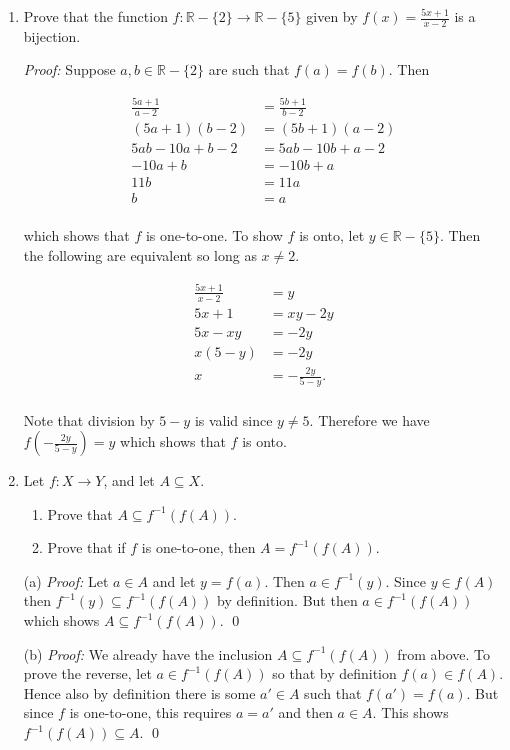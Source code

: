 \documentclass[12pt]{article}
\begin{document}
{\begin{enumerate}
This shows that for every $a\in A$, the values $(f\circ g)^{-1}(a)$ and $(g^{-1}\circ f^{-1})(a)$ are both $b$.  Therefore $(f \circ g)^{-1} = g^{-1} \circ f^{-1}$. \qed


\item Prove that the function $f:\mathbb{R} - \{2\} \to \mathbb{R} - \{5\}$ given by $f(x) = \displaystyle \frac{5x+1}{x-2}$ is a bijection.

{\it Proof:} Suppose $a,b\in \mathbb R-\{2\}$ are such that $f(a)=f(b)$.  Then

\begin{align*}
  \frac{5a+1}{a-2}&=\frac{5b+1}{b-2} \\
  (5a+1)(b-2)&= (5b+1)(a-2) \\
  5ab -10a+b-2 &=5ab-10b+a-2 \\
  -10a+b &= -10b+a \\
  11b&=11a\\
  b&=a\\
\end{align*}

which shows that $f$ is one-to-one.  To show $f$ is onto, let $y\in \mathbb R-\{5\}$.  Then the following are equivalent so long as $x\ne 2$.

\begin{align*}
  \frac{5x+1}{x-2} &= y\\
  5x+1 &= xy-2y \\
  5x-xy&=-2y \\
  x(5-y)&=-2y \\
  x &= -\frac{2y}{5-y}.\\
\end{align*}

Note that division by $5-y$ is valid since $y\ne 5$.  Therefore we have $f\left(-\frac{2y}{5-y}\right)=y$ which shows that $f$ is onto.

\item Let $f:X \to Y$, and let $A \subseteq X$.
\begin{enumerate}
\item Prove that $A \subseteq f^{-1}(f(A))$.
\item Prove that if $f$ is one-to-one, then $A = f^{-1}(f(A))$.
\end{enumerate}

(a) {\it Proof:} Let $a\in A$ and let $y=f(a)$.  Then $a\in f^{-1}(y)$.  Since $y\in f(A)$ then $f^{-1}(y)\subseteq f^{-1}(f(A))$ by definition.  But then $a\in f^{-1}(f(A))$ which shows $A\subseteq f^{-1}(f(A))$. \qed

(b) {\it Proof:} We already have the inclusion $A\subseteq f^{-1}(f(A))$ from above.  To prove the reverse, let $a\in f^{-1}(f(A))$ so that by definition $f(a)\in f(A)$.  Hence also by definition there is some $a'\in A$ such that $f(a')=f(a)$.  But since $f$ is one-to-one, this requires $a=a'$ and then $a\in A$.  This shows $f^{-1}(f(A))\subseteq A$.  \qed


\end{enumerate}}
\end{document}
